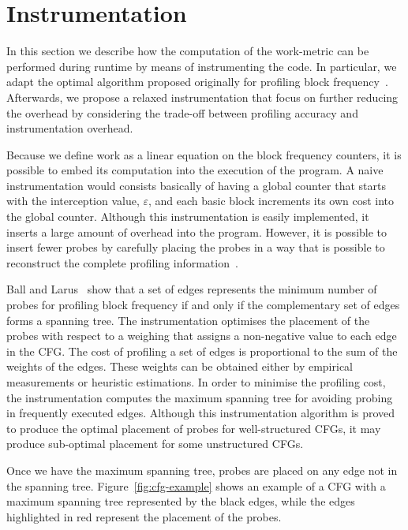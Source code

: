 \documentclass[sigplan,9pt]{acmart}
\begin{document}
\section{Instrumentation}

In this section we describe how the computation of the work-metric can be
performed during runtime by means of instrumenting the code.
In particular, we adapt the optimal algorithm proposed originally 
for profiling block frequency~\cite{knuth73,ball94}.
Afterwards, we propose a relaxed instrumentation that focus on
further reducing the overhead by considering the trade-off between
profiling accuracy and instrumentation overhead.

Because we define work as a linear equation on the block frequency counters,
it is possible to embed its computation into the execution of the program.
A naive instrumentation would consists basically of having a global counter
that starts with the interception value, $\varepsilon$, and each basic block
increments its own cost into the global counter. Although this instrumentation
is easily implemented, it inserts a large amount of overhead into the program.
However, it is possible to insert fewer probes by carefully placing the probes
in a way that is possible to reconstruct
the complete profiling information~\cite{knuth73,ball94}.

Ball and Larus~\cite{ball94} show that a set of edges represents the minimum
number of probes for profiling block frequency if and only if the complementary
set of edges forms a spanning tree.
The instrumentation optimises the placement of the probes with respect to a
weighing that assigns a non-negative value to each edge in the CFG.
The cost of profiling a set of edges is proportional to the sum of the weights
of the edges.
These weights can be obtained either by empirical measurements or heuristic
estimations.
In order to minimise the profiling cost, the instrumentation computes the
maximum spanning tree for avoiding probing in frequently executed edges.
Although this instrumentation algorithm is proved to produce the optimal
placement of probes for well-structured CFGs, it may produce sub-optimal
placement for some unstructured CFGs.

Once we have the maximum spanning tree, probes are placed on any edge not in 
the spanning tree. Figure~\ref{fig:cfg-example} shows an example of a CFG
with a maximum spanning tree represented by the black edges, while the edges 
highlighted in red represent the placement of the probes.
\end{document}
